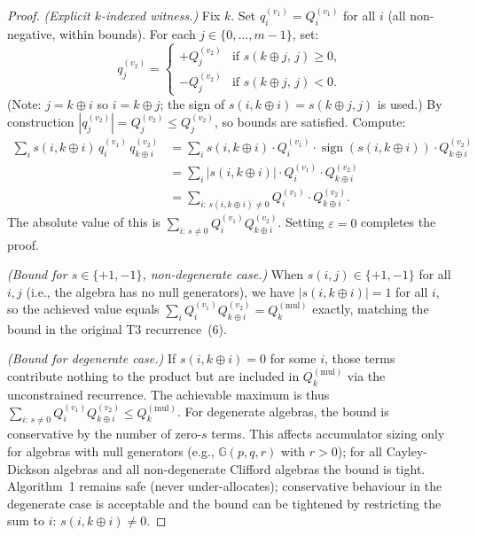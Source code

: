 \documentclass[11pt,a4paper]{article}
\theoremstyle{definition}
\theoremstyle{plain}
\theoremstyle{remark}
\newcommand{\GA}{\mathbb{G}}
\begin{document}
\begin{proof}
\textit{(Explicit $k$-indexed witness.)}
Fix $k$.
Set $q_i^{(v_1)} = Q_i^{(v_1)}$ for all $i$ (all non-negative, within bounds).
For each $j \in \{0,\ldots,m-1\}$, set:
\[
  q_j^{(v_2)} =
  \begin{cases}
    +Q_j^{(v_2)} & \text{if } s(k\oplus j,\,j) \ge 0,\\
    -Q_j^{(v_2)} & \text{if } s(k\oplus j,\,j) < 0.
  \end{cases}
\]
(Note: $j = k \oplus i$ so $i = k \oplus j$; the sign of $s(i, k\oplus i) =
s(k\oplus j, j)$ is used.)
By construction $|q_j^{(v_2)}| = Q_j^{(v_2)} \le Q_j^{(v_2)}$, so bounds are
satisfied.
Compute:
\begin{align*}
  \sum_i s(i,k\oplus i)\, q_i^{(v_1)}\, q_{k\oplus i}^{(v_2)}
  &= \sum_i s(i,k\oplus i)\cdot Q_i^{(v_1)}
       \cdot \operatorname{sign}(s(i,k\oplus i))\cdot Q_{k\oplus i}^{(v_2)}\\
  &= \sum_i |s(i,k\oplus i)|\cdot Q_i^{(v_1)}\cdot Q_{k\oplus i}^{(v_2)}\\
  &= \sum_{i:\,s(i,k\oplus i)\ne 0} Q_i^{(v_1)}\cdot Q_{k\oplus i}^{(v_2)}.
\end{align*}
The absolute value of this is $\sum_{i:\,s\ne 0} Q_i^{(v_1)} Q_{k\oplus i}^{(v_2)}$.
Setting $\varepsilon = 0$ completes the proof.

\textit{(Bound for $s \in \{+1,-1\}$, non-degenerate case.)}
When $s(i,j) \in \{+1,-1\}$ for all $i,j$ (i.e., the algebra has no
null generators), we have $|s(i,k\oplus i)| = 1$ for all $i$, so
the achieved value equals $\sum_i Q_i^{(v_1)} Q_{k\oplus i}^{(v_2)} = Q_k^{(\mathrm{mul})}$
exactly, matching the bound in the original T3 recurrence~(6).

\textit{(Bound for degenerate case.)}
If $s(i,k\oplus i) = 0$ for some $i$, those terms contribute nothing to
the product but are included in $Q_k^{(\mathrm{mul})}$ via the unconstrained
recurrence.
The achievable maximum is thus $\sum_{i:\,s\ne 0} Q_i^{(v_1)} Q_{k\oplus i}^{(v_2)}
\le Q_k^{(\mathrm{mul})}$.
For degenerate algebras, the bound is conservative by the number of zero-$s$
terms.
This affects accumulator sizing only for algebras with null generators
(e.g., $\GA(p,q,r)$ with $r > 0$); for all Cayley-Dickson algebras and all
non-degenerate Clifford algebras the bound is tight.
Algorithm~1 remains safe (never under-allocates); conservative behaviour in
the degenerate case is acceptable and the bound can be tightened by
restricting the sum to $i:\,s(i,k\oplus i)\ne 0$.
\end{proof}
\end{document}
